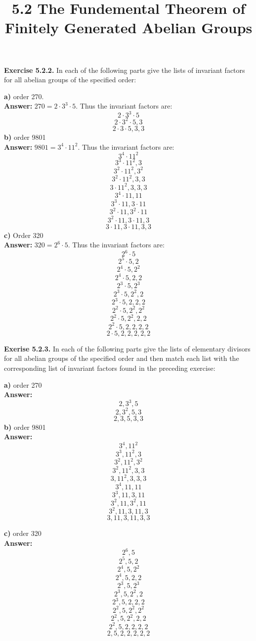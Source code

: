 \documentclass{article}
\title{\textbf{5.2 The Fundemental Theorem of Finitely Generated Abelian Groups}}
\begin{document}
	\maketitle
	\textbf{Exercise 5.2.2.} In each of the following parts give the lists of invariant factors for all abelian groups of the specified order:
	\begin{itemize}
		\textbf{a)} order 270. \\
		\textbf{Answer:} $270 = 2 \cdot 3^3 \cdot 5$. Thus the invariant factors are:
			$$2 \cdot 3^3 \cdot 5$$
			$$2 \cdot 3^2 \cdot 5, 3$$
			$$2 \cdot 3 \cdot 5, 3, 3$$
		\textbf{b)} order 9801 \\
		\textbf{Answer:} $9801 = 3^4 \cdot 11^2$. Thus the invariant factors are:
			$$3^4 \cdot 11^2$$
			$$3^3 \cdot 11^2, 3$$
			$$3^2 \cdot 11^2, 3^2$$
			$$3^2 \cdot 11^2, 3, 3$$
			$$3 \cdot 11^2, 3, 3, 3$$
			$$3^4 \cdot 11, 11$$
			$$3^3 \cdot 11, 3 \cdot 11$$
			$$3^2 \cdot 11, 3^2 \cdot 11$$
			$$3^2 \cdot 11, 3 \cdot 11, 3$$
			$$3 \cdot 11, 3 \cdot 11, 3, 3$$
		\textbf{c)} Order 320 \\
		\textbf{Answer:} $320 = 2^6 \cdot 5$. Thus the invariant factors are:
			$$2^6 \cdot 5$$
			$$2^5 \cdot 5, 2$$
			$$2^4 \cdot 5, 2^2$$
			$$2^4 \cdot 5, 2, 2$$
			$$2^3 \cdot 5, 2^3$$
			$$2^3 \cdot 5, 2^2, 2$$
			$$2^3 \cdot 5, 2, 2, 2$$
			$$2^2 \cdot 5, 2^2, 2^2$$
			$$2^2 \cdot 5, 2^2, 2, 2$$
			$$2^2 \cdot 5, 2, 2, 2, 2$$
			$$2 \cdot 5, 2, 2, 2, 2, 2$$
	\end{itemize}
	\textbf{Exerise 5.2.3.} In each of the following parts give the lists of elementary divisors for all abelian groups of the specified order and then match each list with the corresponding list of invariant factors found in the preceding exercise:
	\begin{itemize}
		\textbf{a)} order 270 \\
		\textbf{Answer:}
			$$2, 3^3, 5$$
			$$2, 3^2, 5, 3$$
			$$2, 3, 5, 3, 3$$
		\textbf{b)} order 9801 \\
		\textbf{Answer:} 
			$$3^4, 11^2$$
			$$3^3, 11^2, 3$$
			$$3^2, 11^2, 3^2$$
			$$3^2, 11^2, 3, 3$$
			$$3, 11^2, 3, 3, 3$$
			$$3^4, 11, 11$$
			$$3^3, 11, 3, 11$$
			$$3^2, 11, 3^2, 11$$
			$$3^2, 11, 3, 11, 3$$
			$$3, 11, 3, 11, 3, 3$$

		\textbf{c)} order 320 \\
		\textbf{Answer:} 
			$$2^6, 5$$
			$$2^5, 5, 2$$
			$$2^4, 5, 2^2$$
			$$2^4, 5, 2, 2$$
			$$2^3, 5, 2^3$$
			$$2^3, 5, 2^2, 2$$
			$$2^3, 5, 2, 2, 2$$
			$$2^2, 5, 2^2, 2^2$$
			$$2^2, 5, 2^2, 2, 2$$
			$$2^2, 5, 2, 2, 2, 2$$
			$$2, 5, 2, 2, 2, 2, 2$$
	\end{itemize}
\end{document}
